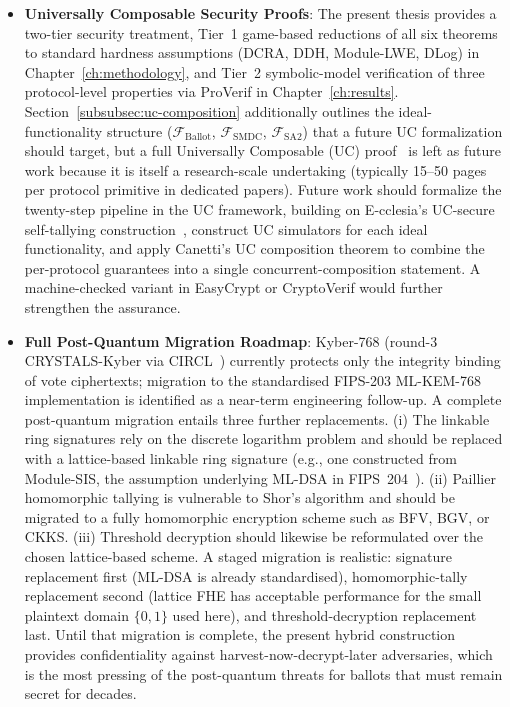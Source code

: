 \begin{itemize}
    \item \textbf{Universally Composable Security Proofs}: The present thesis provides a two-tier security treatment, Tier~1 game-based reductions of all six theorems to standard hardness assumptions (DCRA, DDH, Module-LWE, DLog) in Chapter~\ref{ch:methodology}, and Tier~2 symbolic-model verification of three protocol-level properties via ProVerif in Chapter~\ref{ch:results}. Section~\ref{subsubsec:uc-composition} additionally outlines the ideal-functionality structure ($\mathcal{F}_{\mathrm{Ballot}}$, $\mathcal{F}_{\mathrm{SMDC}}$, $\mathcal{F}_{\mathrm{SA2}}$) that a future UC formalization should target, but a full Universally Composable (UC) proof~\cite{canetti2001uc,ecclesia2025} is left as future work because it is itself a research-scale undertaking (typically 15--50 pages per protocol primitive in dedicated papers). Future work should formalize the twenty-step pipeline in the UC framework, building on E-cclesia's UC-secure self-tallying construction~\cite{ecclesia2025}, construct UC simulators for each ideal functionality, and apply Canetti's UC composition theorem to combine the per-protocol guarantees into a single concurrent-composition statement. A machine-checked variant in EasyCrypt or CryptoVerif would further strengthen the assurance.
    
    \item \textbf{Full Post-Quantum Migration Roadmap}: Kyber-768 (round-3 CRYSTALS-Kyber via CIRCL~\cite{nist_kyber}) currently protects only the integrity binding of vote ciphertexts; migration to the standardised FIPS-203 ML-KEM-768 implementation is identified as a near-term engineering follow-up. A complete post-quantum migration entails three further replacements. (i) The linkable ring signatures rely on the discrete logarithm problem and should be replaced with a lattice-based linkable ring signature (e.g., one constructed from Module-SIS, the assumption underlying ML-DSA in FIPS~204~\cite{nist_mldsa}). (ii) Paillier homomorphic tallying is vulnerable to Shor's algorithm and should be migrated to a fully homomorphic encryption scheme such as BFV, BGV, or CKKS. (iii) Threshold decryption should likewise be reformulated over the chosen lattice-based scheme. A staged migration is realistic: signature replacement first (ML-DSA is already standardised), homomorphic-tally replacement second (lattice FHE has acceptable performance for the small plaintext domain $\{0, 1\}$ used here), and threshold-decryption replacement last. Until that migration is complete, the present hybrid construction provides confidentiality against harvest-now-decrypt-later adversaries, which is the most pressing of the post-quantum threats for ballots that must remain secret for decades.
    

\end{itemize}

